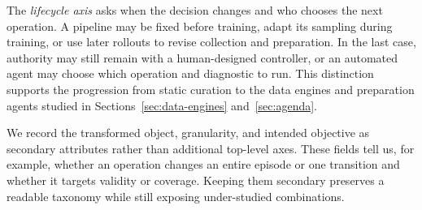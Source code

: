 The \emph{lifecycle axis} asks when the decision changes and who chooses the next operation.
A pipeline may be fixed before training, adapt its sampling during training, or use later rollouts to revise collection and preparation.
In the last case, authority may still remain with a human-designed controller, or an automated agent may choose which operation and diagnostic to run.
This distinction supports the progression from static curation to the data engines and preparation agents studied in Sections~\ref{sec:data-engines} and~\ref{sec:agenda}.

We record the transformed object, granularity, and intended objective as secondary attributes rather than additional top-level axes.
These fields tell us, for example, whether an operation changes an entire episode or one transition and whether it targets validity or coverage.
Keeping them secondary preserves a readable taxonomy while still exposing under-studied combinations.
